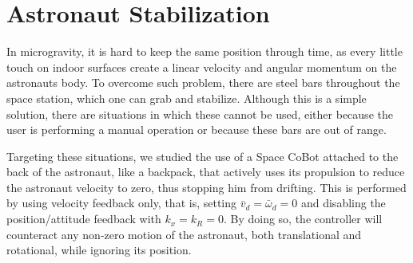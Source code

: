\documentclass{article}
\begin{document}



\section{Astronaut Stabilization}
\label{sec:astr-stab}

In microgravity, it is hard to keep the same position through time, as every little touch 
on indoor surfaces create a linear velocity and angular momentum on the astronauts body.
To overcome such problem, there are steel bars throughout the space station, which one
can grab and stabilize. Although this is a simple solution, there are situations in which 
these cannot be used, either because the user is performing a manual operation or because
these bars are out of range. 

Targeting these situations, we studied the use of a Space CoBot
attached to the back of the astronaut, like a backpack, that actively
uses its propulsion to reduce the astronaut velocity to zero, thus
stopping him from drifting. This is performed by using velocity
feedback only, that is, setting $\bar{v}_d=\bar{\omega}_d=0$ and
disabling the position/attitude feedback with $k_x=k_R=0$. By doing
so, the controller will counteract any non-zero motion of the
astronaut, both translational and rotational, while ignoring its
position.
\end{document}
